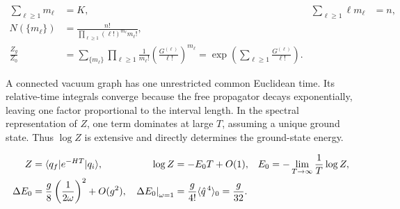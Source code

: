 \begin{align}
  \sum_{\ell\geq1}m_\ell&=K,
  &\sum_{\ell\geq1}\ell m_\ell&=n,
  \nonumber\\
  N(\{m_\ell\})
  &=\frac{n!}{\prod_{\ell\geq1}(\ell!)^{m_\ell}m_\ell!},
  \label{eq:253a-ch02-component-count}\\
  \frac{Z_g}{Z_0}
  &=\sum_{\{m_\ell\}}\prod_{\ell\geq1}\frac1{m_\ell!}
  \left(\frac{G^{(\ell)}}{\ell!}\right)^{m_\ell}
  =\exp\!\left(\sum_{\ell\geq1}\frac{G^{(\ell)}}{\ell!}\right).
  \label{eq:253a-ch02-connected-exponentiation}
\end{align}

A connected vacuum graph has one unrestricted common Euclidean time. Its relative-time integrals converge because the free propagator decays exponentially, leaving one factor proportional to the interval length. In the spectral representation of $Z$, one term dominates at large $T$, assuming a unique ground state. Thus $\log Z$ is extensive and directly determines the ground-state energy.

\begin{align}
  Z&=\langle q_f\rvert e^{-HT}\lvert q_i\rangle,
  &\log Z&=-E_0T+O(1),
  &E_0&=-\lim_{T\to\infty}\frac1T\log Z,
  \label{eq:253a-ch02-vacuum-energy}\\
  \Delta E_0&=\frac{g}{8}\left(\frac1{2\omega}\right)^2+O(g^2),
  &\left.\Delta E_0\right|_{\omega=1}
  &=\frac{g}{4!}\langle\hat q^{\,4}\rangle_0
  =\frac{g}{32}.
  \label{eq:253a-ch02-first-vacuum-energy-shift}
\end{align}

